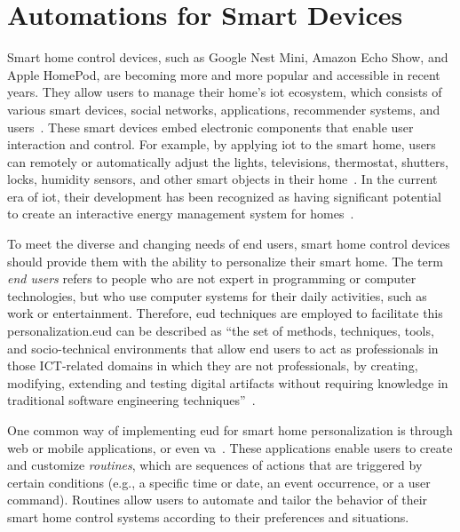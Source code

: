 \section{Automations for Smart Devices}

Smart home control devices, such as Google Nest Mini, Amazon Echo Show, and Apple HomePod, are becoming more and more popular and accessible in recent years. They allow users to manage their home's \acrshort{iot} ecosystem, which consists of various smart devices, social networks, applications, recommender systems, and users~\parencite{barricelliDesigningEndUserDevelopment2015}. These smart devices embed electronic components that enable user interaction and control. For example, by applying \acrshort{iot} to the smart home, users can remotely or automatically adjust the lights, televisions, thermostat, shutters, locks, humidity sensors, and other smart objects in their home~\parencite{kortuemSmartObjectsBuilding2010,wuRespectChangeUser2017}. In the current era of \acrshort{iot}, their development has been recognized as having significant potential to create an interactive energy management system for homes~\parencite{graditiInnovativeControlLogics2015}.

To meet the diverse and changing needs of end users, smart home control devices should provide them with the ability to personalize their smart home. The term \textit{end users} refers to people who are not expert in programming or computer technologies, but who use computer systems for their daily activities, such as work or entertainment. Therefore, \acrfull{eud} techniques are employed to facilitate this personalization.\@ \acrshort{eud} can be described as “the set of methods, techniques, tools, and socio-technical environments that allow end users to act as professionals in those ICT-related domains in which they are not professionals, by creating, modifying, extending and testing digital artifacts without requiring knowledge in traditional software engineering techniques”~\parencite{barricelliEnduserDevelopmentEnduser2019}.

One common way of implementing \acrshort{eud} for smart home personalization is through web or mobile applications, or even \acrfull{va}~\parencite{barricelliVirtualAssistantsPersonalizing2021,arditoSmartObjectsSmart2018}. These applications enable users to create and customize \textit{routines}, which are sequences of actions that are triggered by certain conditions (e.g., a specific time or date, an event occurrence, or a user command). Routines allow users to automate and tailor the behavior of their smart home control systems according to their preferences and situations.


